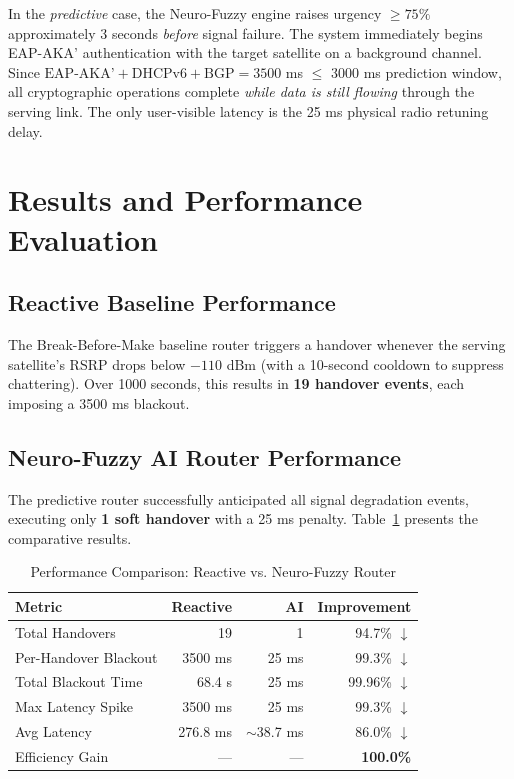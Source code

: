 \documentclass[conference]{IEEEtran}
\begin{document}
In the \textit{predictive} case, the Neuro-Fuzzy engine raises urgency $\geq 75\%$ approximately 3 seconds \textit{before} signal failure. The system immediately begins EAP-AKA' authentication with the target satellite on a background channel. Since $\text{EAP-AKA'} + \text{DHCPv6} + \text{BGP} = 3500$ ms $\leq$ 3000 ms prediction window, all cryptographic operations complete \textit{while data is still flowing} through the serving link. The only user-visible latency is the 25 ms physical radio retuning delay.

\section{Results and Performance Evaluation}

\subsection{Reactive Baseline Performance}

The Break-Before-Make baseline router triggers a handover whenever the serving satellite's RSRP drops below $-110$ dBm (with a 10-second cooldown to suppress chattering). Over 1000 seconds, this results in \textbf{19 handover events}, each imposing a 3500 ms blackout.

\subsection{Neuro-Fuzzy AI Router Performance}

The predictive router successfully anticipated all signal degradation events, executing only \textbf{1 soft handover} with a 25 ms penalty. Table~\ref{tab:results} presents the comparative results.

\begin{table}[htbp]
\caption{Performance Comparison: Reactive vs. Neuro-Fuzzy Router}
\label{tab:results}
\centering
\begin{tabular}{l r r r}
\toprule
\textbf{Metric} & \textbf{Reactive} & \textbf{AI} & \textbf{Improvement} \\
\midrule
Total Handovers & 19 & 1 & 94.7\% $\downarrow$ \\
Per-Handover Blackout & 3500 ms & 25 ms & 99.3\% $\downarrow$ \\
Total Blackout Time & 68.4 s & 25 ms & 99.96\% $\downarrow$ \\
Max Latency Spike & 3500 ms & 25 ms & 99.3\% $\downarrow$ \\
Avg Latency & 276.8 ms & $\sim$38.7 ms & 86.0\% $\downarrow$ \\
Efficiency Gain & --- & --- & \textbf{100.0\%} \\
\bottomrule
\end{tabular}
\end{table}
\end{document}
